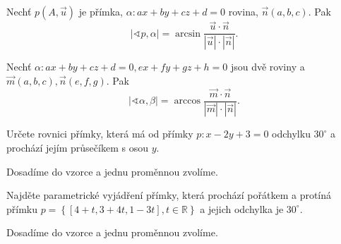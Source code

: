 \begin{veta}
    Nechť $p(A,\vec u)$ je přímka, $\alpha:ax+by+cz+d=0$ rovina, $\vec n(a,b,c)$. Pak
    $$|\sphericalangle p, \alpha|=\arcsin \frac{\vec u \cdot \vec n}{|\vec u|\cdot |\vec n|}.$$
\end{veta}

\begin{veta}
    Nechť $\alpha:ax+by+cz+d=0, ex+fy+gz+h=0$ jsou dvě roviny a $\vec m(a,b,c), \vec n(e,f,g).$
    Pak
    $$|\sphericalangle \alpha, \beta|=\arccos \frac{\vec m \cdot \vec n}{|\vec m|\cdot |\vec n|}.$$
\end{veta}

\begin{priklad}
Určete rovnici přímky, která má od přímky $p:x-2y+3=0$ odchylku $30^\circ$ a prochází
jejím průsečíkem s osou $y$.
\end{priklad}

\begin{reseni}
Dosadíme do vzorce a jednu proměnnou zvolíme.
\end{reseni}

\begin{priklad}
Najděte parametrické vyjádření přímky, která prochází pořátkem a protíná přímku $p=\left \{ [4+t,3+4t,1-3t],t\in \mathbb R \right \} $
a jejich odchylka je $30^\circ$.
\end{priklad}

\begin{reseni}
Dosadíme do vzorce a jednu proměnnou zvolíme.
\end{reseni}
